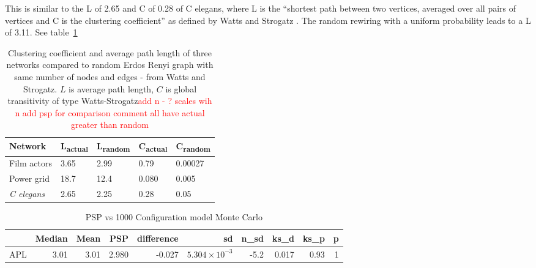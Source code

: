 This is similar to the L of 2.65 and C of 0.28 of C elegans, where L is the ``shortest path between two vertices, averaged over all pairs of vertices and C is the clustering coefficient'' as defined by Watts and Strogatz \cite{watts1998collective}. The random rewiring with a uniform probability leads to a L of 3.11.  See table~\ref{tab:clustering and path length Watts and Strogatz}


\begin{table}[h]
    \centering
    \begin{tabular}{lllll}
    \toprule
    Network      & L\textsubscript{actual} & L\textsubscript{random} & C\textsubscript{actual} & C\textsubscript{random} \\
    \midrule
     Film actors    & 3.65 & 2.99 & 0.79 & 0.00027\\
     Power grid & 18.7 & 12.4 & 0.080 & 0.005 \\
     \textit{C elegans} & 2.65 & 2.25 & 0.28 & 0.05 \\
     \bottomrule
    \end{tabular}
    \caption{Clustering coefficient and average path length of three networks compared to random Erdos Renyi graph with same number of nodes and edges - from Watts and Strogatz\cite{watts1998collective}. $L$ is average path length, $C$ is global transitivity of type Watts-Strogatz\textcolor{red}{add n - ? scales wih n add psp for comparison comment all have actual greater than random}}
    \label{tab:clustering and path length Watts and Strogatz}
\end{table}


\begin{table}[ht]
\centering
\begin{adjustbox}{width=\textwidth}

\begin{tabular}{rrrrrrrrrr}
  \toprule
 & Median & Mean & PSP & difference & sd & n\_sd & ks\_d & ks\_p & p \\ 
  \midrule
APL & 3.01 & 3.01 & 2.980 & -0.027 & $5.304 \times 10^{-3}$ & -5.2 & 0.017 & 0.93 & 1 \\ 

   \bottomrule
\end{tabular}
\end{adjustbox}
\caption{PSP vs 1000 Configuration model Monte Carlo} 
\end{table}


